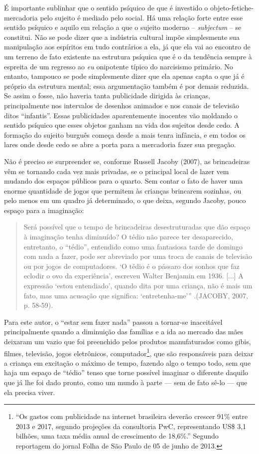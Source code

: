 É importante sublinhar que o sentido psíquico de que é investido o
objeto-fetiche-mercadoria pelo sujeito é mediado pelo social. Há uma
relação forte entre esse sentido psíquico e aquilo em relação a que o
sujeito moderno -- \emph{subjectum} -- se constitui. Não se pode dizer
que a indústria cultural impõe simplesmente sua manipulação aos
espíritos em tudo contrários a ela, já que ela vai ao encontro de um
terreno de fato existente na estrutura psíquica que é o da tendência
sempre à espreita de um regresso ao \emph{eu} onipotente típico do
narcisismo primário. No entanto, tampouco se pode simplesmente dizer que
ela apenas capta o que já é próprio da estrutura mental; essa
argumentação também é por demais reduzida. Se assim o fosse, não haveria
tanta publicidade dirigida às crianças, principalmente nos intervalos de
desenhos animados e nos canais de televisão ditos ``infantis''. Essas
publicidades aparentemente inocentes vão moldando o sentido psíquico que
esses objetos ganham na vida dos sujeitos desde cedo. A formação do
sujeito burguês começa desde a mais tenra infância, e em todos os lares
onde desde cedo se abre a porta para a mercadoria fazer sua pregação.

Não é preciso se surpreender se, conforme Russell Jacoby (2007), as
brincadeiras vêm se tornando cada vez mais privadas, se o principal
local de lazer vem mudando dos espaços públicos para o quarto. Sem
contar o fato de haver uma enorme quantidade de jogos que permitem às
crianças brincarem sozinhas, ou pelo menos em um quadro já determinado,
o que deixa, segundo Jacoby, pouco espaço para a imaginação:

\begin{quote}
Será possível que o tempo de brincadeiras desestruturadas que dão espaço
à imaginação tenha diminuído? O tédio não parece ter desaparecido,
entretanto, o ``tédio'', entendido como uma fantasiosa tarde de domingo
com nada a fazer, pode ser abreviado por uma troca de canais de
televisão ou por jogos de computadores. `O tédio é o pássaro dos sonhos
que faz eclodir o ovo da experiência', escreveu Walter Benjamin em 1936.
{[}...{]} A expressão `estou entendiado', quando dita por uma criança,
não é mais um fato, mas uma acusação que significa: `entretenha-me'''
.(JACOBY, 2007, p. 58-59).
\end{quote}

Para este autor, o ``estar sem fazer nada'' passou a tornar-se
inaceitável principalmente quando a diminuição das famílias e a ida ao
mercado das mães deixaram um vazio que foi preenchido pelos produtos
manufaturados como gibis, filmes, televisão, jogos eletrônicos,
computador\footnote{``Os gastos com publicidade na internet brasileira
  deverão crescer 91\% entre 2013 e 2017, segundo projeções da
  consultoria PwC, representando US\$ 3,1 bilhões, uma taxa média anual
  de crescimento de 18,6\%.'' Segundo reportagem do jornal Folha de São
  Paulo de 05 de junho de 2013.}, que são responsáveis para deixar a
criança em excitação o máximo de tempo, fazendo algo o tempo todo, sem
que haja um espaço de ``tédio'' tenso que torne possível imaginar o
diferente daquilo que já lhe foi dado pronto, como um mundo à parte ---
sem de fato sê-lo --- que ela precisa viver.

